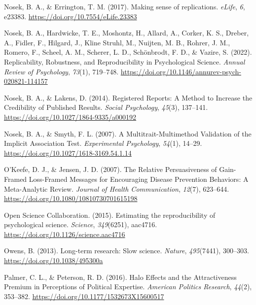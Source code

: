 \documentclass[
  letterpaper,
]{book}
\newlength{\cslhangindent}
\newenvironment{CSLReferences}[2] %
 {\begin{list}{}{%
  \setlength{\itemindent}{0pt}
  \setlength{\leftmargin}{0pt}
  \setlength{\parsep}{0pt}
  \ifodd #1
   \setlength{\leftmargin}{\cslhangindent}
   \setlength{\itemindent}{-1\cslhangindent}
  \fi
  \setlength{\itemsep}{#2\baselineskip}}}
 {\end{list}}
\begin{document}
\begin{CSLReferences}{1}{0}
Nosek, B. A., \& Errington, T. M. (2017). Making sense of replications.
\emph{eLife}, \emph{6}, e23383.
\url{https://doi.org/10.7554/eLife.23383}

Nosek, B. A., Hardwicke, T. E., Moshontz, H., Allard, A., Corker, K. S.,
Dreber, A., Fidler, F., Hilgard, J., Kline Struhl, M., Nuijten, M. B.,
Rohrer, J. M., Romero, F., Scheel, A. M., Scherer, L. D., Schönbrodt, F.
D., \& Vazire, S. (2022). Replicability, {Robustness}, and
{Reproducibility} in {Psychological} {Science}. \emph{Annual Review of
Psychology}, \emph{73}(1), 719--748.
\url{https://doi.org/10.1146/annurev-psych-020821-114157}

Nosek, B. A., \& Lakens, D. (2014). Registered {Reports}: {A} {Method}
to {Increase} the {Credibility} of {Published} {Results}. \emph{Social
Psychology}, \emph{45}(3), 137--141.
\url{https://doi.org/10.1027/1864-9335/a000192}

Nosek, B. A., \& Smyth, F. L. (2007). A {Multitrait}-{Multimethod
Validation} of the {Implicit Association Test}. \emph{Experimental
Psychology}, \emph{54}(1), 14--29.
\url{https://doi.org/10.1027/1618-3169.54.1.14}

O'Keefe, D. J., \& Jensen, J. D. (2007). The {Relative} {Persuasiveness}
of {Gain}-{Framed} {Loss}-{Framed} {Messages} for {Encouraging}
{Disease} {Prevention} {Behaviors}: {A} {Meta}-{Analytic} {Review}.
\emph{Journal of Health Communication}, \emph{12}(7), 623--644.
\url{https://doi.org/10.1080/10810730701615198}

Open Science Collaboration. (2015). Estimating the reproducibility of
psychological science. \emph{Science}, \emph{349}(6251), aac4716.
\url{https://doi.org/10.1126/science.aac4716}

Owens, B. (2013). Long-term research: {Slow} science. \emph{Nature},
\emph{495}(7441), 300--303. \url{https://doi.org/10.1038/495300a}

Palmer, C. L., \& Peterson, R. D. (2016). Halo {Effects} and the
{Attractiveness} {Premium} in {Perceptions} of {Political} {Expertise}.
\emph{American Politics Research}, \emph{44}(2), 353--382.
\url{https://doi.org/10.1177/1532673X15600517}


\end{CSLReferences}
\end{document}
